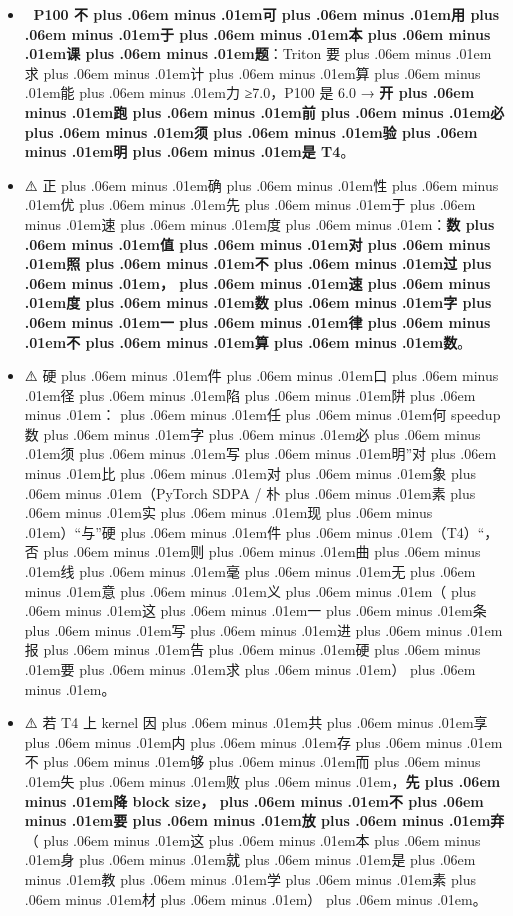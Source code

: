 \documentclass[
]{article}
\providecommand{\tightlist}{%
  \setlength{\itemsep}{0pt}\setlength{\parskip}{0pt}}
\def\zh#1{{\zhfont #1}}
\def\sym#1{{\symfont #1}}
\def\emo#1{{\emofont #1}}
\def\zhglue{\hskip0pt plus .06em minus .01em}
\begin{document}
\begin{itemize}
\tightlist
\item
  \emo{🚨} \textbf{P100 \zh{不\zhglue 可\zhglue 用\zhglue 于\zhglue 本\zhglue 课\zhglue 题}}\zh{：}Triton \zh{要\zhglue 求\zhglue 计\zhglue 算\zhglue 能\zhglue 力} \sym{≥}7.0\zh{，}P100 \zh{是} 6.0 \sym{→} \textbf{\zh{开\zhglue 跑\zhglue 前\zhglue 必\zhglue 须\zhglue 验\zhglue 明\zhglue 是} T4}\zh{。}
\item
  \sym{⚠️} \zh{正\zhglue 确\zhglue 性\zhglue 优\zhglue 先\zhglue 于\zhglue 速\zhglue 度\zhglue ：}\textbf{\zh{数\zhglue 值\zhglue 对\zhglue 照\zhglue 不\zhglue 过\zhglue ，\zhglue 速\zhglue 度\zhglue 数\zhglue 字\zhglue 一\zhglue 律\zhglue 不\zhglue 算\zhglue 数}}\zh{。}
\item
  \sym{⚠️} \zh{硬\zhglue 件\zhglue 口\zhglue 径\zhglue 陷\zhglue 阱\zhglue ：\zhglue 任\zhglue 何} speedup \zh{数\zhglue 字\zhglue 必\zhglue 须\zhglue 写\zhglue 明}''\zh{对\zhglue 比\zhglue 对\zhglue 象\zhglue （}PyTorch SDPA / \zh{朴\zhglue 素\zhglue 实\zhglue 现\zhglue ）}``\zh{与}''\zh{硬\zhglue 件\zhglue （}T4\zh{）}``\zh{，} \zh{否\zhglue 则\zhglue 曲\zhglue 线\zhglue 毫\zhglue 无\zhglue 意\zhglue 义\zhglue （\zhglue 这\zhglue 一\zhglue 条\zhglue 写\zhglue 进\zhglue 报\zhglue 告\zhglue 硬\zhglue 要\zhglue 求\zhglue ）\zhglue 。}
\item
  \sym{⚠️} \zh{若} T4 \zh{上} kernel \zh{因\zhglue 共\zhglue 享\zhglue 内\zhglue 存\zhglue 不\zhglue 够\zhglue 而\zhglue 失\zhglue 败\zhglue ，}\textbf{\zh{先\zhglue 降} block size\zh{，\zhglue 不\zhglue 要\zhglue 放\zhglue 弃}}\zh{（\zhglue 这\zhglue 本\zhglue 身\zhglue 就\zhglue 是\zhglue 教\zhglue 学\zhglue 素\zhglue 材\zhglue ）\zhglue 。}
\end{itemize}
\end{document}
